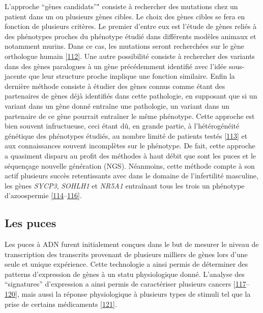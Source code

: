 \documentclass[12pt,a4paper,twoside]{ugathesis}
\theoremstyle{definition}
\theoremstyle{definition}
\theoremstyle{definition}
\theoremstyle{remark}
\begin{document}
L'approche ``gènes candidats''" consiste à rechercher des mutations chez
un patient dans un ou plusieurs gènes cibles. Le choix des gènes cibles
se fera en fonction de plusieurs critères. Le premier d'entre eux est
l'étude de gènes reliés à des phénotypes proches du phénotype étudié
dans différents modèles animaux et notamment murins. Dans ce cas, les
mutations seront recherchées sur le gène orthologue humain
{[}\protect\hyperlink{ref-DeBoer2015}{112}{]}. Une autre possibilité
consiste à rechercher des variants dans des gènes paralogues à un gène
précédemment identifié avec l'idée sous-jacente que leur structure
proche implique une fonction similaire. Enfin la dernière méthode
consiste à étudier des gènes connus comme étant des partenaires de gènes
déjà identifiés dans cette pathologie, en supposant que si un variant
dans un gène donné entraîne une pathologie, un variant dans un
partenaire de ce gène pourrait entraîner le même phénotype. Cette
approche est bien souvent infructueuse, ceci étant dû, en grande partie,
à l'hétérogénéité génétique des phénotypes étudiés, au nombre limité de
patients testés {[}\protect\hyperlink{ref-ElInati2012}{113}{]} et aux
connaissances souvent incomplètes sur le phénotype. De fait, cette
approche a quasiment disparu au profit des méthodes à haut débit que
sont les puces et le séquençage nouvelle génération (NGS). Néanmoins,
cette méthode compte à son actif plusieurs succès retentissants avec
dans le domaine de l'infertilité masculine, les gènes \emph{SYCP3},
\emph{SOHLH1} et \emph{NR5A1} entraînant tous les trois un phénotype
d'azoospermie
{[}\protect\hyperlink{ref-Miyamoto2003}{114}--\protect\hyperlink{ref-Bashamboo2010}{116}{]}.

\newpage

\subsection{Les puces}\label{les-puces}

Les puces à ADN furent initialement conçues dans le but de mesurer le
niveau de transcription des transcrits provenant de plusieurs milliers
de gènes lors d'une seule et unique expérience. Cette technologie a
ainsi permis de déterminer des patterns d'expression de gènes à un statu
physiologique donné. L'analyse des ``signatures'' d'expression a ainsi
permis de caractériser plusieurs cancers
{[}\protect\hyperlink{ref-Alon1999}{117}--\protect\hyperlink{ref-VantVeer2002}{120}{]},
mais aussi la réponse physiologique à plusieurs types de stimuli tel que
la prise de certains médicaments
{[}\protect\hyperlink{ref-Brachat2002}{121}{]}.
\end{document}
